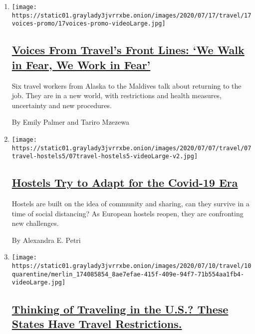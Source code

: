 \begin{enumerate}
\def\labelenumi{\arabic{enumi}.}
\item
  \texttt{[image: https://static01.graylady3jvrrxbe.onion/images/2020/07/17/travel/17voices-promo/17voices-promo-videoLarge.jpg]}

  \hypertarget{voices-from-travels-front-lines-we-walk-in-fear-we-work-in-fear}{%
  \subsection{\texorpdfstring{\href{/2020/07/17/travel/coronavirus-travel-hospitality-workers.html}{Voices
  From Travel's Front Lines: `We Walk in Fear, We Work in
  Fear'}}{Voices From Travel's Front Lines: `We Walk in Fear, We Work in Fear'}}\label{voices-from-travels-front-lines-we-walk-in-fear-we-work-in-fear}}

  Six travel workers from Alaska to the Maldives talk about returning to
  the job. They are in a new world, with restrictions and health
  measures, uncertainty and new procedures.

  By Emily Palmer and Tariro Mzezewa
\item
  \texttt{[image: https://static01.graylady3jvrrxbe.onion/images/2020/07/07/travel/07travel-hostels5/07travel-hostels5-videoLarge-v2.jpg]}

  \hypertarget{hostels-try-to-adapt-for-the-covid-19-era}{%
  \subsection{\texorpdfstring{\href{/2020/07/07/travel/virus-hostels-backpacking.html}{Hostels
  Try to Adapt for the Covid-19
  Era}}{Hostels Try to Adapt for the Covid-19 Era}}\label{hostels-try-to-adapt-for-the-covid-19-era}}

  Hostels are built on the idea of community and sharing, can they
  survive in a time of social distancing? As European hostels reopen,
  they are confronting new challenges.

  By Alexandra E. Petri
\item
  \texttt{[image: https://static01.graylady3jvrrxbe.onion/images/2020/07/10/travel/10quarentine/merlin\_174085854\_8ae7efae-415f-409e-94f7-71b554aa1fb4-videoLarge.jpg]}

  \hypertarget{thinking-of-traveling-in-the-us-these-states-have-travel-restrictions}{%
  \subsection{\texorpdfstring{\href{/2020/07/10/travel/state-travel-restrictions.html}{Thinking
  of Traveling in the U.S.? These States Have Travel
  Restrictions.}}{Thinking of Traveling in the U.S.? These States Have Travel Restrictions.}}\label{thinking-of-traveling-in-the-us-these-states-have-travel-restrictions}}


\end{enumerate}
